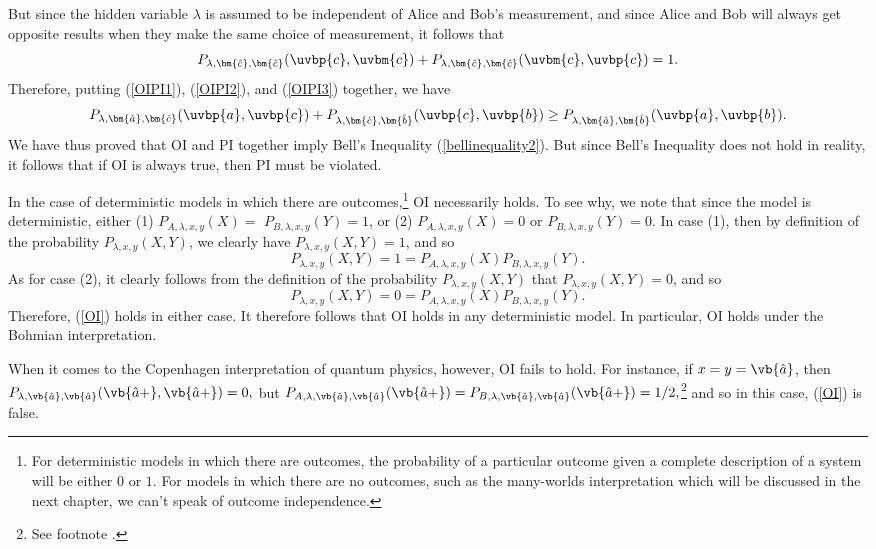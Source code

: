 \documentclass[12pt]{report}
\begin{document}
But since the hidden variable $\lambda$ is assumed to be independent of Alice and Bob's measurement, and since Alice and Bob will always get opposite results when they make the same choice of measurement, it follows that 
\begin{equation}\label{OIPI3}
P_{\lambda,\bm{\hat{c}},\bm{\hat{c}}}(\uvbp{c},\uvbm{c})+P_{\lambda,\bm{\hat{c}},\bm{\hat{c}}}(\uvbm{c},\uvbp{c})=1.
\end{equation}
Therefore, putting (\ref{OIPI1}), (\ref{OIPI2}), and (\ref{OIPI3}) together, we have
\begin{equation}
P_{\lambda,\bm{\hat{a}},\bm{\hat{c}}}(\uvbp{a},\uvbp{c})+P_{\lambda,\bm{\hat{c}},\bm{\hat{b}}}(\uvbp{c},\uvbp{b})\geq P_{\lambda,\bm{\hat{a}},\bm{\hat{b}}}(\uvbp{a},\uvbp{b}).
\end{equation}
We have thus proved that OI and PI together imply Bell's Inequality (\ref{bellinequality2}). But since Bell's Inequality does not hold in reality, it follows that if OI is always true, then PI must be violated.\label{OIPIproofend}


\label{OIdet}In the case of deterministic models in which there are outcomes,\footnote{For deterministic models in which there are outcomes, the probability of a particular outcome given a complete description of a system will be either $0$ or $1$. For models in which there are no outcomes, such as the many-worlds interpretation which will be discussed in the next chapter, we can't speak of outcome independence.} OI necessarily holds. To see why, we note that since the model is deterministic, either (1)  $P_{A, \lambda,x,y}(X)=$ $P_{B, \lambda,x,y}(Y)=1$, or (2) $P_{A, \lambda,x,y}(X)=0$ or $P_{B, \lambda,x,y}(Y)=0$. In case (1), then by definition of the probability $P_{\lambda,x,y}(X , Y)$, we clearly have $P_{\lambda,x,y} (X,Y)=1$, and so
$$P_{\lambda,x,y} (X,Y)=1=P_{A, \lambda,x,y}(X)P_{B, \lambda,x,y}(Y).$$
As for case (2), it clearly follows from the definition of the probability $P_{\lambda,x,y}(X , Y)$ that $P_{\lambda,x,y}(X , Y) = 0$, and so
$$P_{\lambda,x,y} (X,Y)=0=P_{A, \lambda,x,y}(X)P_{B, \lambda,x,y}(Y).$$
Therefore, (\ref{OI}) holds in either case. It therefore follows that OI holds in any deterministic model. In particular, OI holds under the Bohmian interpretation. 

When it comes to the Copenhagen interpretation of quantum physics, however, OI fails to hold. For instance, if $x=y=\vb{\hat{a}}$, then $P_{\lambda,\vb{\hat{a}},\vb{\hat{a}}}(\vb{\hat{a}+},\vb{\hat{a}+})=0,$ but $P_{A, \lambda,\vb{\hat{a}},\vb{\hat{a}}}(\vb{\hat{a}+})=P_{B, \lambda,\vb{\hat{a}},\vb{\hat{a}}}(\vb{\hat{a}+})=1/2,$\footnote{See footnote . } and so in this case, (\ref{OI}) is false. 
\end{document}
